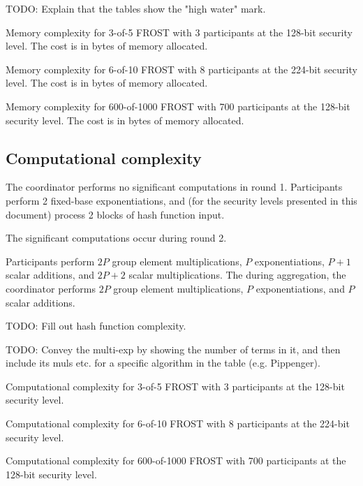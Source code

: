 TODO: Explain that the tables show the "high water" mark.

\begin{table}
	\centering
	\caption{Memory complexity for 3-of-5 FROST with 3 participants at the 128-bit security level. The cost is in bytes of memory allocated.}
\end{table}

\begin{table}
	\centering
	\caption{Memory complexity for 6-of-10 FROST with 8 participants at the 224-bit security level. The cost is in bytes of memory allocated.}
\end{table}

\begin{table}
	\centering
	\caption{Memory complexity for 600-of-1000 FROST with 700 participants at the 128-bit security level. The cost is in bytes of memory allocated.}
\end{table}

\subsection{Computational complexity}

The coordinator performs no significant computations in round 1. Participants
perform 2 fixed-base exponentiations, and (for the security levels presented in
this document) process 2 blocks of hash function input.

The significant computations occur during round 2.

Participants perform $2P$ group element multiplications, $P$ exponentiations,
$P + 1$ scalar additions, and $2P + 2$ scalar multiplications. The during
aggregation, the coordinator performs $2P$ group element multiplications, $P$
exponentiations, and $P$ scalar additions.

TODO: Fill out hash function complexity.

TODO: Convey the multi-exp by showing the number of terms in it, and then include
its muls etc. for a specific algorithm in the table (e.g. Pippenger).

\begin{table}
	\centering
	\caption{Computational complexity for 3-of-5 FROST with 3 participants at the 128-bit security level.}
\end{table}

\begin{table}
	\centering
	\caption{Computational complexity for 6-of-10 FROST with 8 participants at the 224-bit security level.}
\end{table}

\begin{table}
	\centering
	\caption{Computational complexity for 600-of-1000 FROST with 700 participants at the 128-bit security level.}
\end{table}
